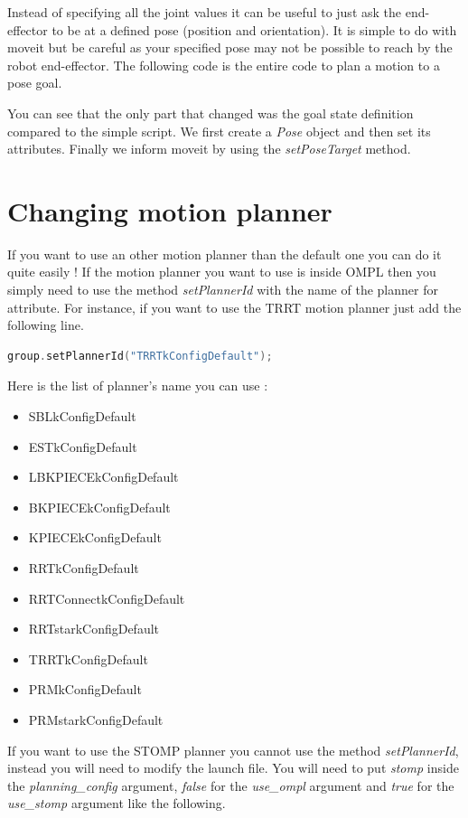Instead of specifying all the joint values it can be useful to just ask the end-effector to be at a defined pose (position and orientation). It is simple to do with moveit but be careful as your specified pose may not be possible to reach by the robot end-effector. The following code is the entire code to plan a motion to a pose goal.



You can see that the only part that changed was the goal state definition compared to the simple script. We first create a \emph{Pose} object and then set its attributes. Finally we inform moveit by using the \emph{setPoseTarget} method.


\section{Changing motion planner}

If you want to use an other motion planner than the default one you can do it quite easily ! If the motion planner you want to use is inside OMPL then you simply need to use the method \emph{setPlannerId} with the name of the planner for attribute. For instance, if you want to use the TRRT motion planner just add the following line.


\begin{lstlisting}[language=c++]
group.setPlannerId("TRRTkConfigDefault");
\end{lstlisting}

Here is the list of planner's name you can use :
\begin{itemize}
\item SBLkConfigDefault
\item ESTkConfigDefault
\item LBKPIECEkConfigDefault
\item BKPIECEkConfigDefault
\item KPIECEkConfigDefault
\item RRTkConfigDefault
\item RRTConnectkConfigDefault
\item RRTstarkConfigDefault
\item TRRTkConfigDefault
\item PRMkConfigDefault
\item PRMstarkConfigDefault
\end{itemize}

If you want to use the STOMP planner you cannot use the method \emph{setPlannerId}, instead you will need to modify the launch file. You will need to put \emph{stomp} inside the \emph{planning\_config} argument, \emph{false} for the \emph{use\_ompl} argument and \emph{true} for the \emph{use\_stomp} argument like the following. 



